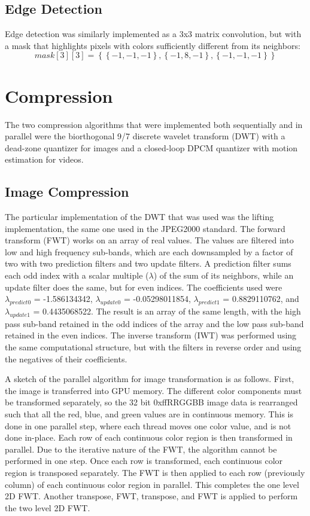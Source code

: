 \documentclass[10pt,twocolumn,twoside]{IEEEtran}
\begin{document}
\subsection{Edge Detection}
Edge detection was similarly implemented as a 3x3 matrix convolution, but with a mask that highlights pixels with colors sufficiently different from its neighbors:
\begin{equation*}
mask[3][3] = \left\{ \left\{-1, -1, -1\right\}, \left\{-1, 8, -1\right\}, \left\{-1, -1, -1\right\} \right\}
\end{equation*}

\section{Compression}
The two compression algorithms that were implemented both sequentially and in parallel were the biorthogonal 9/7 discrete wavelet transform (DWT) with a dead-zone quantizer for images and a closed-loop DPCM quantizer with motion estimation for videos.

\subsection{Image Compression}	
The particular implementation of the DWT that was used was the lifting implementation, the same one used in the JPEG2000 standard. The forward transform (FWT) works on an array of real values. The values are filtered into low and high frequency sub-bands, which are each downsampled by a factor of two with two prediction filters and two update filters. A prediction filter sums each odd index with a scalar multiple ($\lambda$) of the sum of its neighbors, while an update filter does the same, but for even indices. The coefficients used were $\lambda_{predict0}$ = -1.586134342, $\lambda_{update0}$ = -0.05298011854, $\lambda_{predict1}$ = 0.8829110762, and $\lambda_{update1}$ = 0.4435068522. The result is an array of the same length, with the high pass sub-band retained in the odd indices of the array and the low pass sub-band retained in the even indices. The inverse transform (IWT) was performed using the same computational structure, but with the filters in reverse order and using the negatives of their coefficients.

A sketch of the parallel algorithm for image transformation is as follows. First, the image is transferred into GPU memory. The different color components must be transformed separately, so the 32 bit 0xffRRGGBB image data is rearranged such that all the red, blue, and green values are in continuous memory. This is done in one parallel step, where each thread moves one color value, and is not done in-place. Each row of each continuous color region is then transformed in parallel. Due to the iterative nature of the FWT, the algorithm cannot be performed in one step. Once each row is transformed, each continuous color region is transposed separately. The FWT is then applied to each row (previously column) of each continuous color region in parallel. This completes the one level 2D FWT. Another transpose, FWT, transpose, and FWT is applied to perform the two level 2D FWT.
\end{document}
